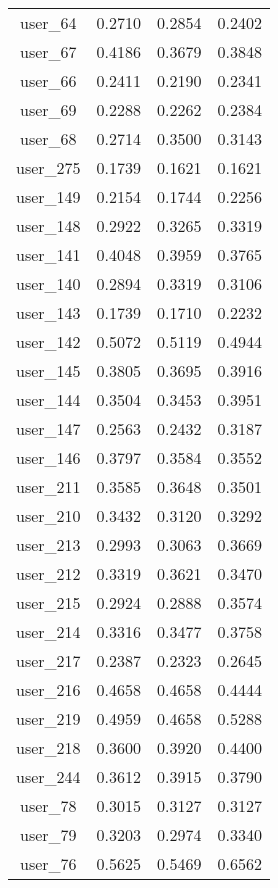 \begin{table}[ht]
\begin{tabular}{|c|c|c|c|}
user_64  &  0.2710   &  0.2854   &  0.2402 \\ 
user_67  &  0.4186   &  0.3679   &  0.3848 \\ 
user_66  &  0.2411   &  0.2190   &  0.2341 \\ 
user_69  &  0.2288   &  0.2262   &  0.2384 \\ 
user_68  &  0.2714   &  0.3500   &  0.3143 \\ 
user_275  &  0.1739   &  0.1621   &  0.1621 \\ 
user_149  &  0.2154   &  0.1744   &  0.2256 \\ 
user_148  &  0.2922   &  0.3265   &  0.3319 \\ 
user_141  &  0.4048   &  0.3959   &  0.3765 \\ 
user_140  &  0.2894   &  0.3319   &  0.3106 \\ 
user_143  &  0.1739   &  0.1710   &  0.2232 \\ 
user_142  &  0.5072   &  0.5119   &  0.4944 \\ 
user_145  &  0.3805   &  0.3695   &  0.3916 \\ 
user_144  &  0.3504   &  0.3453   &  0.3951 \\ 
user_147  &  0.2563   &  0.2432   &  0.3187 \\ 
user_146  &  0.3797   &  0.3584   &  0.3552 \\ 
user_211  &  0.3585   &  0.3648   &  0.3501 \\ 
user_210  &  0.3432   &  0.3120   &  0.3292 \\ 
user_213  &  0.2993   &  0.3063   &  0.3669 \\ 
user_212  &  0.3319   &  0.3621   &  0.3470 \\ 
user_215  &  0.2924   &  0.2888   &  0.3574 \\ 
user_214  &  0.3316   &  0.3477   &  0.3758 \\ 
user_217  &  0.2387   &  0.2323   &  0.2645 \\ 
user_216  &  0.4658   &  0.4658   &  0.4444 \\ 
user_219  &  0.4959   &  0.4658   &  0.5288 \\ 
user_218  &  0.3600   &  0.3920   &  0.4400 \\ 
user_244  &  0.3612   &  0.3915   &  0.3790 \\ 
user_78  &  0.3015   &  0.3127   &  0.3127 \\ 
user_79  &  0.3203   &  0.2974   &  0.3340 \\ 
user_76  &  0.5625   &  0.5469   &  0.6562 \\ 

\end{tabular}
\end{table}
